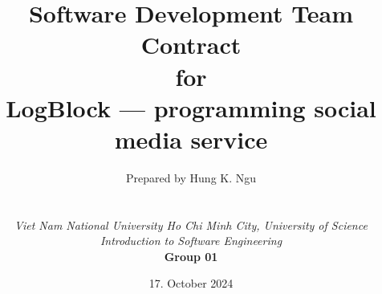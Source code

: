 
\def\Institute{\textit{Viet Nam National University Ho Chi Minh City, University of Science}}
\def\Course{\textit{Introduction to Software Engineering}}
\def\GroupID{\textbf{Group 01}}

\def\BoldTitle{Software Development Team Contract}

\def\Subtitle{for \\ LogBlock --- programming social media service \\}
\def\Authors{Prepared by Hung K. Ngu } 


\title{\textbf{\BoldTitle}\\\Subtitle}
\author{\Authors\\ \\ \\ \Institute\\ \Course\\ \GroupID\\}
\date{17. October 2024}

